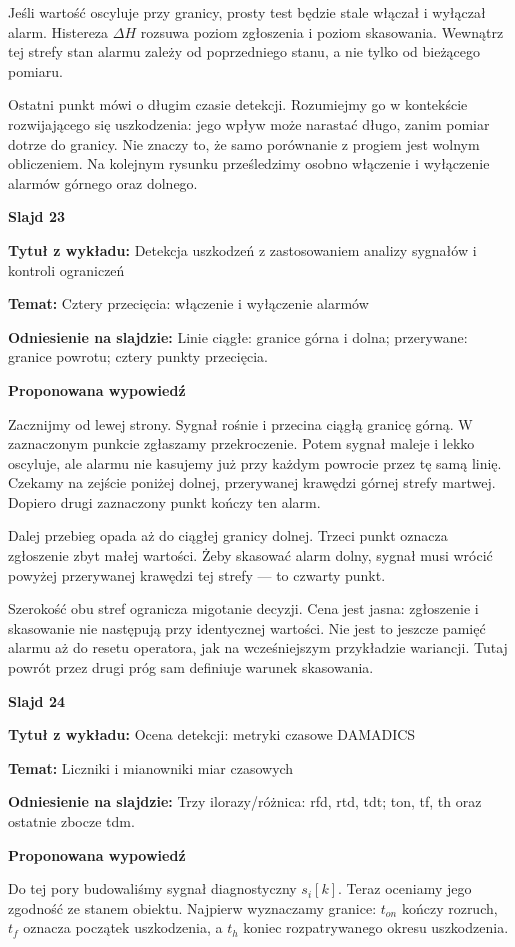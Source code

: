 \documentclass[a4paper,11pt]{article}
\newcommand{\NumerSlajdu}{1}
\newcommand{\Komentarz}[3]{%
  \gdef\NumerSlajdu{#1}%
  {\Large\bfseries Slajd #1\par}\smallskip
  \textbf{Tytuł z wykładu:} #2\par
  \textbf{Temat:} #3\par\medskip
}
\begin{document}
Jeśli wartość oscyluje przy granicy, prosty test będzie stale włączał i wyłączał alarm. Histereza $\Delta H$ rozsuwa poziom zgłoszenia i poziom skasowania. Wewnątrz tej strefy stan alarmu zależy od poprzedniego stanu, a nie tylko od bieżącego pomiaru.

Ostatni punkt mówi o długim czasie detekcji. Rozumiejmy go w kontekście rozwijającego się uszkodzenia: jego wpływ może narastać długo, zanim pomiar dotrze do granicy. Nie znaczy to, że samo porównanie z progiem jest wolnym obliczeniem. Na kolejnym rysunku prześledzimy osobno włączenie i wyłączenie alarmów górnego oraz dolnego.
\clearpage

\Komentarz{23}{Detekcja uszkodzeń z zastosowaniem analizy sygnałów i kontroli ograniczeń}{Cztery przecięcia: włączenie i wyłączenie alarmów}
{\small\color{black!65}\textbf{Odniesienie na slajdzie:} Linie ciągłe: granice górna i dolna; przerywane: granice powrotu; cztery punkty przecięcia.\par}
\medskip
\textbf{Proponowana wypowiedź}\par
Zacznijmy od lewej strony. Sygnał rośnie i przecina ciągłą granicę górną. W zaznaczonym punkcie zgłaszamy przekroczenie. Potem sygnał maleje i lekko oscyluje, ale alarmu nie kasujemy już przy każdym powrocie przez tę samą linię. Czekamy na zejście poniżej dolnej, przerywanej krawędzi górnej strefy martwej. Dopiero drugi zaznaczony punkt kończy ten alarm.

Dalej przebieg opada aż do ciągłej granicy dolnej. Trzeci punkt oznacza zgłoszenie zbyt małej wartości. Żeby skasować alarm dolny, sygnał musi wrócić powyżej przerywanej krawędzi tej strefy — to czwarty punkt.

Szerokość obu stref ogranicza migotanie decyzji. Cena jest jasna: zgłoszenie i skasowanie nie następują przy identycznej wartości. Nie jest to jeszcze pamięć alarmu aż do resetu operatora, jak na wcześniejszym przykładzie wariancji. Tutaj powrót przez drugi próg sam definiuje warunek skasowania.
\clearpage

\Komentarz{24}{Ocena detekcji: metryki czasowe DAMADICS}{Liczniki i mianowniki miar czasowych}
{\small\color{black!65}\textbf{Odniesienie na slajdzie:} Trzy ilorazy/różnica: rfd, rtd, tdt; ton, tf, th oraz ostatnie zbocze tdm.\par}
\medskip
\textbf{Proponowana wypowiedź}\par
Do tej pory budowaliśmy sygnał diagnostyczny $s_i[k]$. Teraz oceniamy jego zgodność ze stanem obiektu. Najpierw wyznaczamy granice: $t_{on}$ kończy rozruch, $t_f$ oznacza początek uszkodzenia, a $t_h$ koniec rozpatrywanego okresu uszkodzenia.
\end{document}
